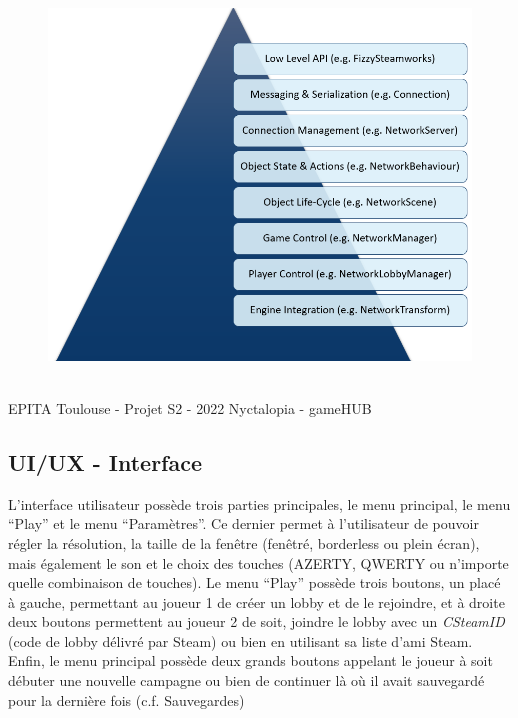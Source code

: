 \newpage
\begin{figure}[H]
\centering
\begin{minipage}{.5\textwidth}
  \centering
  \centerline{\includegraphics[width=1.5\linewidth]{img/HLAPI.png}}
  \label{fig:hlapistructure}
\end{minipage}%
\end{figure}

\vfill
\noindent\makebox[\linewidth]{\rule{.8\paperwidth}{.6pt}}\\[0.2cm]
EPITA Toulouse - Projet S2 - 2022 \hfill Nyctalopia - gameHUB
\noindent\makebox[\linewidth]{\rule{.8\paperwidth}{.6pt}}

\newpage


\subsection{UI/UX - Interface}
\setlength{\parindent}{5ex}
L'interface utilisateur possède trois parties principales, le menu principal, le menu ``Play'' et le menu ``Paramètres''. Ce dernier permet à l'utilisateur de pouvoir régler la résolution, la taille de la fenêtre (fenêtré, borderless ou plein écran), mais également le son et le choix des touches (AZERTY, QWERTY ou n'importe quelle combinaison de touches).
Le menu ``Play'' possède trois boutons, un placé à gauche, permettant au joueur 1 de créer un lobby et de le rejoindre, et à droite deux boutons permettent au joueur 2 de soit, joindre le lobby avec un \emph{CSteamID} (code de lobby délivré par Steam) ou bien en utilisant sa liste d'ami Steam.
Enfin, le menu principal possède deux grands boutons appelant le joueur à soit débuter une nouvelle campagne ou bien de continuer là où il avait sauvegardé pour la dernière fois (c.f. Sauvegardes)

